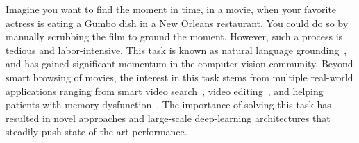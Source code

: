 \documentclass[10pt,twocolumn,letterpaper]{article}
\begin{document}
 
Imagine you want to find the moment in time, in a movie, when your favorite actress is eating a Gumbo dish in a New Orleans restaurant. You could do so by manually scrubbing the film to ground the moment. However, such a process is tedious and labor-intensive. This task is known as natural language grounding~\cite{Hendricks_2017_ICCV,Gao_2017_ICCV}, and has gained significant momentum in the computer vision community. Beyond smart browsing of movies, the interest in this task stems from multiple real-world applications ranging from smart video search~\cite{sivic2003video, snoek2009mediamill}, video editing~\cite{xiong2021transcript,pardo2021learning,pardo2021moviecuts}, and helping patients with memory dysfunction~\cite{budson2005memory, toyama2015towards}. The importance of solving this task has resulted in novel approaches and large-scale deep-learning architectures that steadily push state-of-the-art performance.
\end{document}
